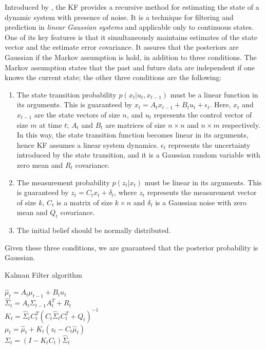 Introduced by \cite{kalman}, the \ac{KF} provides a recursive method for estimating the state of a dynamic system with presence of noise. It is a technique for filtering and prediction in \emph{linear Gaussian systems} and applicable only to continuous states. One of its key features is that it simultaneously maintains estimates of the state vector and the estimate error covariance. It assures that the posteriors are Gaussian if the Markov assumption is hold, in addition to three conditions. The Markov assumption states that the past and future data are independent if one knows the current state; the other three conditions are the following:
\begin{enumerate}
    \item{The state transition probability $p\left( x_t | u_t, x_{t-1}\right)$ must be a linear function in its arguments. This is guaranteed by $ x_t = A_t x_{t-1} + B_t u_t + \epsilon_t $. Here, $x_t$ and $x_{t-1}$ are the state vectors of size $n$, and $u_t$ represents the control vector of size $m$ at time $t$; $A_t$ and $B_t$ are matrices of size $n \times n$ and $n\times m$ respectively. In this way, the state transition function becomes linear in its arguments, hence \ac{KF} assumes a linear system dynamics. $\epsilon_t$ represents the uncertainty introduced by the state transition, and it is a Gaussian random variable with zero mean and $R_t$ covariance.}
    \item{The measurement probability $p\left(z_t | x_t\right)$ must be linear in its arguments. This is guaranteed by $z_t = C_t x_t + \delta_t$, where $z_t$ represents the measurement vector of size $k$, $C_t$ is a matrix of size $k \times n$ and $\delta_t$ is a Gaussian noise with zero mean and $Q_t$ covariance.}
    \item{The initial belief should be normally distributed.}
\end{enumerate}
Given these three conditions, we are guaranteed that the posterior probability is Gaussian.\\
\begin{algorithm}[h]
    \caption{Kalman Filter algorithm}
    \label{alg:chapter1:kf}

    \BlankLine
    \BlankLine
    $\hat\mu_t = A_t \mu_{t-1} + B_t u_t$ \\
    $\hat\Sigma_t = A_t \Sigma_{t-1} A_t^T + R_t$ \\
    \BlankLine
    $K_t = \hat\Sigma_t C_t^T \left(C_t \hat\Sigma_t C_t^T + Q_t\right)^{-1}$ \\
    $\mu_t = \hat\mu_t + K_t \left(z_t - C_t \hat\mu_t \right) $ \\
    $\Sigma_t = (I - K_t C_t) \hat\Sigma_t$ \\
    \BlankLine
\end{algorithm}


